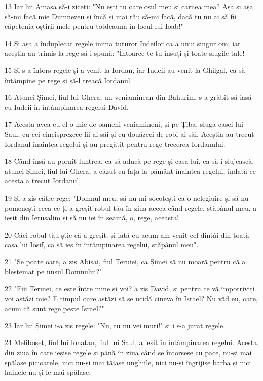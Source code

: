 \par 13 Iar lui Amasa să-i ziceți: "Nu ești tu oare osul meu și carnea mea? Așa și așa să-mi facă mie Dumnezeu și încă și mai rău să-mi facă, dacă tu nu ai să fii căpetenia oștirii mele pentru totdeauna în locul lui Ioab!"
\par 14 Și așa a înduplecat regele inima tuturor Iudeilor ca a unui singur om; iar aceștia au trimis la rege să-i spună: "Întoarce-te tu însuți și toate slugile tale!
\par 15 Și s-a întors regele și a venit la Iordan, iar Iudeii au venit la Ghilgal, ca să întâmpine pe rege și să-l treacă Iordanul.
\par 16 Atunci Șimei, fiul lui Ghera, un veniaminean din Bahurim, s-a grăbit să iasă cu Iudeii în întâmpinarea regelui David.
\par 17 Acesta avea cu el o mie de oameni veniamineni, și pe Țiba, sluga casei lui Saul, cu cei cincisprezece fii ai săi și cu douăzeci de robi ai săi. Aceștia au trecut Iordanul înaintea regelui și au pregătit pentru rege trecerea Iordanului.
\par 18 Când însă au pornit luntrea, ca să aducă pe rege și casa lui, ca să-i slujească, atunci Șimei, fiul lui Ghera, a căzut cu fața la pământ înaintea regelui, îndată ce acesta a trecut Iordanul,
\par 19 Și a zis către rege: "Domnul meu, să nu-mi socotești ca o nelegiuire și să nu pomenești ceea ce ți-a greșit robul tău în ziua aceea când regele, stăpânul meu, a ieșit din Ierusalim și să nu iei în seamă, o, rege, aceasta!
\par 20 Căci robul tău știe că a greșit. și iată eu acum am venit cel dintâi din toată casa lui Iosif, ca să ies în întâmpinarea regelui, stăpânul meu".
\par 21 "Se poate oare, a zis Abișai, fiul Țeruiei, ca Șimei să nu moară pentru că a blestemat pe unsul Domnului?"
\par 22 "Fiii Țeruiei, ce este între mine și voi? a zis David, și pentru ce vă împotriviți voi astăzi mie? E timpul oare astăzi să se ucidă cineva în Israel? Nu văd eu, oare, acum că sunt rege peste Israel?"
\par 23 Iar lui Șimei i-a zis regele: "Nu, tu nu vei muri!" și i s-a jurat regele.
\par 24 Mefiboșet, fiul lui Ionatan, fiul lui Saul, a ieșit în întâmpinarea regelui. Acesta, din ziua în care ieșise regele și până în ziua când se întorsese cu pace, nu-și mai spălase picioarele, nici nu-și mai tăiase unghiile, nici nu-și îngrijise barba și nici hainele nu și le mai spălase.
